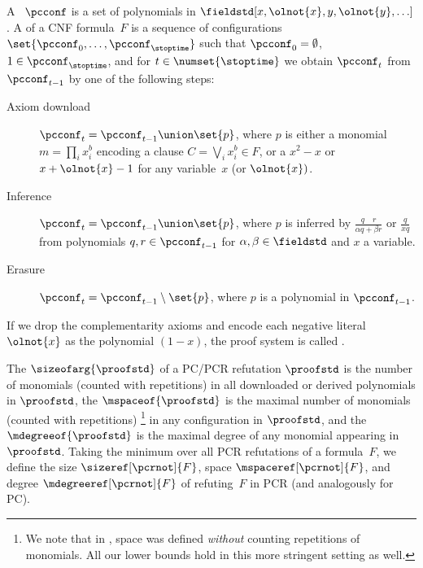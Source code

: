 \documentclass{toc}
\begin{document}
\begin{definition}
  \label{def:sequential-refutation}
  A ~$\pcconf$ is a set of
%
  polynomials 
  in
%
  $\fieldstd[x, \olnot{x}, y, \olnot{y}, \ldots]$.
  A 
   of a CNF formula~$F$
  is a
  sequence of configurations $\set{\pcconf_0, \ldots,
    \pcconf_\stoptime}$ such that $\pcconf_0 = \emptyset$, $1 \in
  \pcconf_{\stoptime}$, and
  for $t \in \numset{\stoptime}$
  we obtain
  $\pcconf_t$
  from $\pcconf_{t-1}$ by one of the following steps:
  \begin{description}
  \item[Axiom download] $\pcconf_t = \pcconf_{t-1} \union \set{p}$,
    where $p$ is either 
    a %
    monomial 
    $m = \prod_i x_i^b$
    encoding 
    a %
    clause
    $C=\bigvee_i x_i^b \in F$,
    or
    a  $x^2 - x$ 
    or
     $x + \olnot{x} - 1$
    for any variable~$x$ (or $\olnot{x})$.
  \item[Inference] $\pcconf_t = \pcconf_{t - 1} \union \set{p}$, where
    $p$ is 
%
%
%
%
%
%
%
%
%
    inferred by 
     $\frac{q \quad r}{\alpha q + \beta r}$
    or
     $\frac{q}{x q}$
    from  polynomials $q, r \in \pcconf_{t - 1}$ 
    for $\alpha, \beta \in \fieldstd$ and $x$ a variable.
  \item[Erasure] $\pcconf_t = \pcconf_{t - 1} \setminus \set{p}$,
    where $p$ is a polynomial in $\pcconf_{t - 1}$.
  \end{description}
  If we drop
  the  %
  complementarity axioms and encode each negative literal
  $\olnot{x}$ as the polynomial $(1 - x)$, the proof system is called
  . 

  The  $\sizeofarg{\proofstd}$ of a
  PC/PCR refutation $\proofstd$ is the number of monomials (counted
  with repetitions) in all downloaded or derived polynomials in
  $\proofstd$, the 
  $\mspaceof{\proofstd}$ is the maximal number of monomials (counted
  with repetitions)%
  \footnote{%
    We note that in
      \cite{ABRW02SpaceComplexity},
      space was defined \emph{without} counting repetitions of monomials. 
      All our lower bounds hold in this more stringent setting as well.}
  in any configuration in $\proofstd$, and the
   $\mdegreeof{\proofstd}$ is the maximal degree
  of any monomial appearing in $\proofstd$.  Taking the minimum over
  all PCR refutations of a formula~$F$, we define the size
  $\sizeref[\pcrnot]{F}$, space $\mspaceref[\pcrnot]{F}$, and degree
  $\mdegreeref[\pcrnot]{F}$ of refuting~$F$ in PCR
  (and analogously for PC).
\end{definition}
\end{document}
